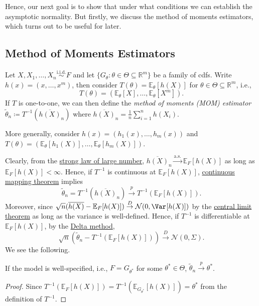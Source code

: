 Hence, our next goal is to show that under what conditions we can establish the asymptotic normality. But firstly, we discuss the method of moments estimators, which turns out to be useful for later.

\subsection{Method of Moments Estimators}
Let \(X, X_1, \dots , X_n \overset{\text{i.i.d.} }{\sim } F\) and let \(\{ G_\theta \colon \theta \in \Theta \subseteq \mathbb{R} ^m \} \) be a family of cdfs. Write \(h(x) = (x, \dots , x^m)\), then consider \(T(\theta ) = \mathbb{E}_{\theta }[h(X)] \) for \(\theta \in \Theta \subseteq \mathbb{R} ^m\), i.e.,
\[
	T(\theta )
	= (\mathbb{E}_{\theta }[X], \dots , \mathbb{E}_{\theta }[X^m] ).
\]
If \(T\) is one-to-one, we can then define the \emph{method of moments (MOM) estimator} \(\widetilde{\theta} _n \coloneqq T^{-1} (\overline{h(X)} _n)\) where \(\overline{h(X)} _n = \frac{1}{n}\sum_{i=1}^{n} h(X_i)\).

\begin{note}
	More generally, consider \(h(x) = (h_1(x), \dots , h_m(x))\) and \(T(\theta ) = (\mathbb{E}_{\theta }[h_1(X)] , \dots , \mathbb{E}_{\theta }[h_m(X)] )\).
\end{note}

Clearly, from the \hyperref[thm:SLLN]{strong law of large number}, \(\overline{h(X)} _n \overset{\text{a.s.} }{\to} \mathbb{E}_{F}[h(X)] \) as long as \(\mathbb{E}_{F}[h(X)] < \infty \). Hence, if \(T^{-1} \) is continuous at \(\mathbb{E}_{F}[h(X)] \), \hyperref[thm:continuous-mapping]{continuous mapping theorem} implies
\[
	\widetilde{\theta} _n
	= T^{-1} (\overline{h(X)} _n)
	\overset{p}{\to} T^{-1} (\mathbb{E}_{F}[h(X)] ).
\]
Moreover, since \(\sqrt{n} (\overline{h(X)} - \mathbb{E}_{F}[h(X)] ) \overset{D}{\to} \mathcal{N} (0, \Var_{}[h(X)] )\) by the \hyperref[thm:CLT]{central limit theorem} as long as the variance is well-defined. Hence, if \(T^{-1} \) is differentiable at \(\mathbb{E}_{F}[h(X)] \), by the \hyperref[thm:delta-method]{Delta method},
\[
	\sqrt{n} (\widetilde{\theta} _n - T^{-1} (\mathbb{E}_{F}[h(X)] ))
	\overset{D}{\to} \mathcal{N} (0, \Sigma ).
\]
We see the following.

\begin{lemma}\label{lma:MOM-consistency}
	If the model is well-specified, i.e., \(F = G_{\theta ^{\ast} }\) for some \(\theta ^{\ast} \in \Theta \), \(\widetilde{\theta} _n \overset{p}{\to} \theta ^{\ast} \).
\end{lemma}
\begin{proof}
	Since \(T^{-1} (\mathbb{E}_{F}[h(X)] ) = T^{-1} (\mathbb{E}_{G_{\theta ^{\ast} }}[h(X)] ) = \theta ^{\ast} \) from the definition of \(T^{-1} \).
\end{proof}

